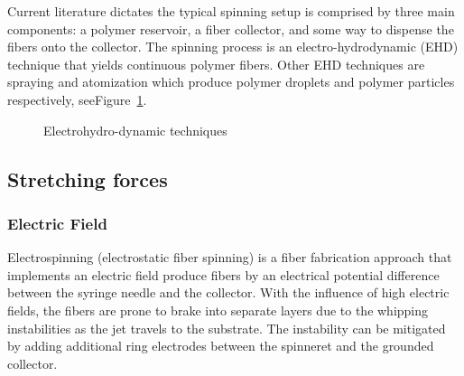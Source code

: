 \documentclass[5p,,preprint,12pt,twocolumn]{elsarticle}
\makeatletter
\def\fixFloatSize#1{}%
\makeatother
\begin{document}
Current literature dictates the typical spinning setup is comprised by three main components: a polymer reservoir, a fiber collector, and some way to dispense the fibers onto the collector. The spinning process is an electro-hydrodynamic (EHD) technique that yields continuous polymer fibers. Other EHD techniques are spraying and atomization which produce polymer droplets and polymer particles respectively, seeFigure~\ref{f-02e0e3cf88d6}.


\bgroup
\fixFloatSize{images/514dfac6-849d-4905-8e40-7adfafc93b5f-uimg_ehd_techniques.png}
\begin{figure}[!htbp]
\centering \makeatletter{}
\makeatother 
\caption{{Electrohydro-dynamic techniques}}
\label{f-02e0e3cf88d6}
\end{figure}
\egroup




\subsection{Stretching forces}



\subsubsection{Electric Field}Electrospinning (electrostatic fiber spinning) is a fiber fabrication approach that implements an electric field produce fibers by an electrical potential difference between the syringe needle and the collector. With the influence of high electric fields, the fibers are prone to brake into separate layers due to the whipping instabilities as the jet travels to the substrate. The instability can be mitigated by adding additional ring electrodes between the spinneret and the grounded collector. \unskip~\cite{527120:13915304}
\end{document}
